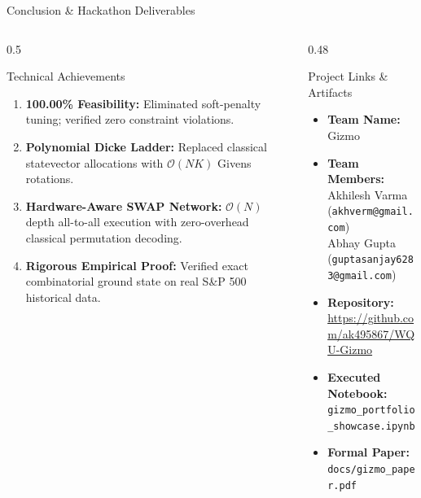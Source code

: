 \documentclass[aspectratio=169,10pt]{beamer}
\begin{document}
\begin{frame}{Conclusion \& Hackathon Deliverables}
\begin{columns}
\begin{column}{0.5\textwidth}
\begin{block}{Technical Achievements}
\begin{enumerate}
    \item \textbf{100.00\% Feasibility:} Eliminated soft-penalty tuning; verified zero constraint violations.
    \item \textbf{Polynomial Dicke Ladder:} Replaced classical statevector allocations with $\mathcal{O}(NK)$ Givens rotations.
    \item \textbf{Hardware-Aware SWAP Network:} $\mathcal{O}(N)$ depth all-to-all execution with zero-overhead classical permutation decoding.
    \item \textbf{Rigorous Empirical Proof:} Verified exact combinatorial ground state on real S\&P 500 historical data.
\end{enumerate}
\end{block}
\end{column}

\begin{column}{0.48\textwidth}
\begin{block}{Project Links \& Artifacts}
\begin{itemize}
    \item \textbf{Team Name:} Gizmo
    \item \textbf{Team Members:} \\
    Akhilesh Varma (\texttt{akhverm@gmail.com}) \\
    Abhay Gupta (\texttt{guptasanjay6283@gmail.com})
    \item \textbf{Repository:} \\
    \url{https://github.com/ak495867/WQU-Gizmo}
    \item \textbf{Executed Notebook:} \\
    \texttt{gizmo\_portfolio\_showcase.ipynb}
    \item \textbf{Formal Paper:} \\
    \texttt{docs/gizmo\_paper.pdf}
\end{itemize}
\end{block}
\end{column}
\end{columns}
\end{frame}
\end{document}
